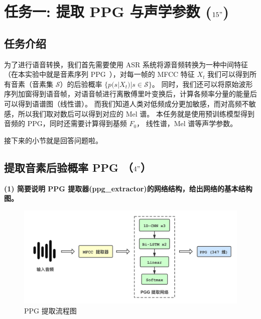 \documentclass[degree=project,degree-type=project,cjk-font=noto]{thuthesis}
\begin{document}
\maketitle

\frontmatter
% 

\tableofcontents

\listoffiguresandtables

\mainmatter

\chapter{任务一: 提取 PPG 与声学参数 ($15"$)}

\section{任务介绍}

为了进行语音转换，我们首先需要使用 ASR 系统将源音频转换为一种中间特征（在本实验中就是音素序列 PPG~\cite{PPG}），对每一帧的 MFCC 特征 $X_t$ 我们可以得到所有音素（音素集 $\mathcal{S}$）的后验概率 $\{p(s | X_t) | s \in \mathcal{S}\}$。
同时，我们还可以将原始波形序列加窗得到语音帧，对语音帧进行离散傅里叶变换后，计算各频率分量的能量后可以得到语谱图（线性谱）。
而我们知道人类对低频成分更加敏感，而对高频不敏感，所以我们取对数后可以得到对应的 Mel 谱。
本任务就是使用预训练模型得到音频的 PPG，同时还需要计算得到基频 $F_0$， 线性谱，Mel 谱等声学参数。

接下来的小节就是回答问题啦。

\section{提取音素后验概率 PPG （$4"$）}

\textbf{(1) 简要说明 PPG 提取器(ppg\_extractor)的网络结构，给出网络的基本结构图。}

\begin{figure}[!htp]
\centering%
\includegraphics[width=.8\linewidth]{PPG.png}
  \caption{PPG 提取流程图}
  \label{fig:ppg}
\end{figure}
\end{document}
